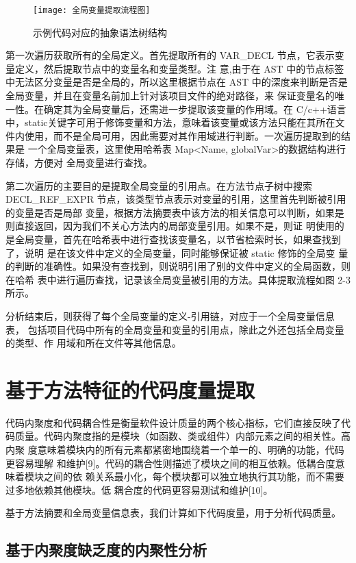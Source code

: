 \begin{figure}[h]
\centering
\texttt{[image: 全局变量提取流程图]}
\caption{示例代码对应的抽象语法树结构}
\end{figure}

第一次遍历获取所有的全局定义。首先提取所有的
VAR\_DECL 节点，它表示变量定义，然后提取节点中的变量名和变量类型。注
意,由于在 AST 中的节点标签中无法区分变量是否是全局的，所以这里根据节点在 AST
中的深度来判断是否是全局变量，并且在变量名前加上针对该项目文件的绝对路径，来
保证变量名的唯一性。在确定其为全局变量后，还需进一步提取该变量的作用域。在
C/c++语言中，static关键字可用于修饰变量和方法，意味着该变量或该方法只能在其所在文
件内使用，而不是全局可用，因此需要对其作用域进行判断。一次遍历提取到的结果是
一个全局变量表，这里使用哈希表 Map<Name, globalVar>的数据结构进行存储，方便对
全局变量进行查找。

第二次遍历的主要目的是提取全局变量的引用点。在方法节点子树中搜索
DECL\_REF\_EXPR 节点，该类型节点表示对变量的引用，这里首先判断被引用的变量是否是局部
变量，根据方法摘要表中该方法的相关信息可以判断，如果是则直接返回，因为我们不关心方法内的局部变量引用。如果不是，则证
明使用的是全局变量，首先在哈希表中进行查找该变量名，以节省检索时长，如果查找到了，说明
是在该文件中定义的全局变量，同时能够保证被 static 修饰的全局变
量的判断的准确性。如果没有查找到，则说明引用了别的文件中定义的全局函数，则在哈希
表中进行遍历查找，记录该全局变量被引用的方法。具体提取流程如图 2-3 所示。

分析结束后，则获得了每个全局变量的定义-引用链，对应于一个全局变量信息表，
包括项目代码中所有的全局变量和变量的引用点，除此之外还包括全局变量的类型、作
用域和所在文件等其他信息。

\section{基于方法特征的代码度量提取}

代码内聚度和代码耦合性是衡量软件设计质量的两个核心指标，它们直接反映了代
码质量。代码内聚度指的是模块（如函数、类或组件）内部元素之间的相关性。高内聚
度意味着模块内的所有元素都紧密地围绕着一个单一的、明确的功能，代码更容易理解
和维护[9]。代码的耦合性则描述了模块之间的相互依赖。低耦合度意味着模块之间的依
赖关系最小化，每个模块都可以独立地执行其功能，而不需要过多地依赖其他模块。低
耦合度的代码更容易测试和维护[10]。


基于方法摘要和全局变量信息表，我们计算如下代码度量，用于分析代码质量。


\subsection{基于内聚度缺乏度的内聚性分析}

